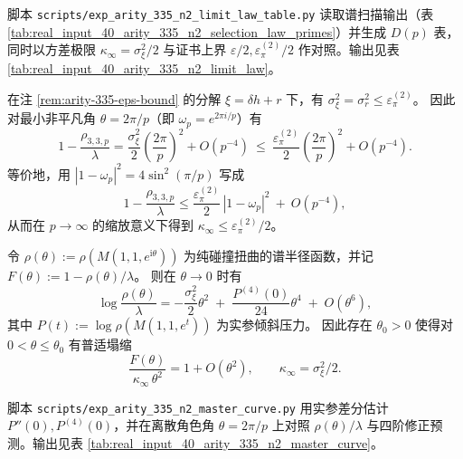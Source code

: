\begin{remark}\label{rem:arity-335-limit-law-table}
脚本 \texttt{scripts/exp\_arity\_335\_n2\_limit\_law\_table.py} 读取谱扫描输出（表 \ref{tab:real_input_40_arity_335_n2_selection_law_primes}）并生成 \(D(p)\) 表，同时以方差极限 \(\kappa_\infty=\sigma_\xi^2/2\) 与证书上界 \(\varepsilon/2,\varepsilon_\pi^{(2)}/2\) 作对照。输出见表 \ref{tab:real_input_40_arity_335_n2_limit_law}。
\end{remark}



\begin{remark}\label{cor:arity-335-eps-trig-bound}
在注 \ref{rem:arity-335-eps-bound} 的分解 \(\xi=\delta h+r\) 下，有 \(\sigma_\xi^2=\sigma_r^2\le \varepsilon_\pi^{(2)}\)。
因此对最小非平凡角 \(\theta=2\pi/p\)（即 \(\omega_p=e^{2\pi i/p}\)）有
$$
1-\frac{\rho_{3,3,p}}{\lambda}
=
\frac{\sigma_\xi^2}{2}\left(\frac{2\pi}{p}\right)^2+O(p^{-4})
\ \le\
\frac{\varepsilon_\pi^{(2)}}{2}\left(\frac{2\pi}{p}\right)^2+O(p^{-4}).
$$
等价地，用 \(|1-\omega_p|^2=4\sin^2(\pi/p)\) 写成
$$
1-\frac{\rho_{3,3,p}}{\lambda}
\le
\frac{\varepsilon_\pi^{(2)}}{2}\,|1-\omega_p|^2\ +\ O(p^{-4}),
$$
从而在 \(p\to\infty\) 的缩放意义下得到 \(\kappa_\infty\le \varepsilon_\pi^{(2)}/2\)。
\end{remark}

\begin{remark}\label{prop:arity-335-master-curve}
令 \(\rho(\theta):=\rho(M(1,1,e^{\mathrm{i}\theta}))\) 为纯碰撞扭曲的谱半径函数，并记
\(
F(\theta):=1-\rho(\theta)/\lambda
\)。
则在 \(\theta\to 0\) 时有
$$
\log\frac{\rho(\theta)}{\lambda}
=
-\frac{\sigma_\xi^2}{2}\theta^2
\;+\;
\frac{P^{(4)}(0)}{24}\theta^4
\;+\;
O(\theta^6),
$$
其中 \(P(t):=\log\rho(M(1,1,e^{t}))\) 为实参倾斜压力。
因此存在 \(\theta_0>0\) 使得对 \(0<\theta\le \theta_0\) 有普适塌缩
$$
\frac{F(\theta)}{\kappa_\infty\,\theta^2}=1+O(\theta^2),
\qquad
\kappa_\infty=\sigma_\xi^2/2.
$$
\end{remark}

\begin{remark}[可复现核验：离散角色点 \texorpdfstring{$\theta=2\pi/p$}{theta=2pi/p} 的主曲线对照]\label{rem:arity-335-master-curve-check}
脚本 \texttt{scripts/exp\_arity\_335\_n2\_master\_curve.py} 用实参差分估计 \(P''(0),P^{(4)}(0)\)，并在离散角色角 \(\theta=2\pi/p\) 上对照 \(\rho(\theta)/\lambda\) 与四阶修正预测。输出见表 \ref{tab:real_input_40_arity_335_n2_master_curve}。
\end{remark}

